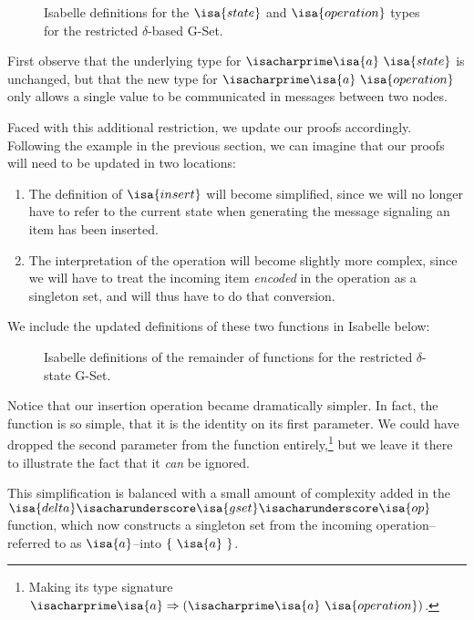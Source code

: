 \begin{figure}[H]
  
  \caption{Isabelle definitions for the $\isa{state}$ and $\isa{operation}$
    types for the restricted $\delta$-based G-Set.}
\end{figure}

First observe that the underlying type for $\isacharprime\isa{a}~\isa{state}$ is
unchanged, but that the new type for $\isacharprime\isa{a}~\isa{operation}$ only
allows a single value to be communicated in messages between two nodes.

Faced with this additional restriction, we update our proofs accordingly.
Following the example in the previous section, we can imagine that our proofs
will need to be updated in two locations:
\begin{enumerate}
  \item The definition of $\isa{insert}$ will become simplified, since we will
    no longer have to refer to the current state when generating the message
    signaling an item has been inserted.
  \item The interpretation of the operation will become slightly more complex,
    since we will have to treat the incoming item \emph{encoded} in the operation
    as a singleton set, and will thus have to do that conversion.
\end{enumerate}

We include the updated definitions of these two functions in Isabelle below:

\begin{figure}[H]
  
  \caption{Isabelle definitions of the remainder of functions for the restricted
    $\delta$-state G-Set.}
\end{figure}

Notice that our insertion operation became dramatically simpler. In fact, the
function is so simple, that it is the identity on its first
parameter. We could have dropped the second parameter from the function
entirely,\footnote{Making its type signature $\isacharprime\isa{a} \Rightarrow
(\isacharprime\isa{a}~\isa{operation})$.} but we leave it there to illustrate
the fact that it \emph{can} be ignored.

This simplification is balanced with a small amount of complexity added in the
$\isa{delta}\isacharunderscore\isa{gset}\isacharunderscore\isa{op}$ function,
which now constructs a singleton set from the incoming operation--referred
to as $\isa{a}$--into $\{~\isa{a}~\}$.


